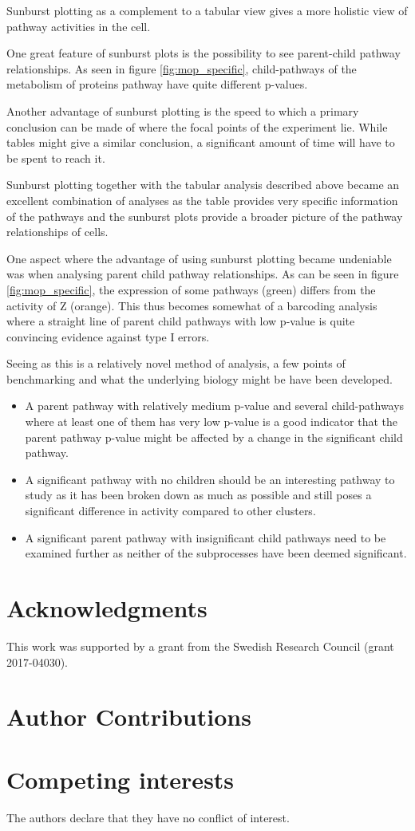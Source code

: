\documentclass[11pt]{article}
\begin{document}
  Sunburst plotting as a complement to a tabular view gives a more holistic view of pathway activities in the cell.

  One great feature of sunburst plots is the possibility to see parent-child pathway relationships. As seen in figure \ref{fig:mop_specific}, child-pathways of the metabolism of proteins pathway have quite different p-values.

  Another advantage of sunburst plotting is the speed to which a primary conclusion can be made of where the focal points of the experiment lie. While tables might give a similar conclusion, a significant amount of time will have to be spent to reach it.

  Sunburst plotting together with the tabular analysis described above became an excellent combination of analyses as the table provides very specific information of the pathways and the sunburst plots provide a broader picture of the pathway relationships of cells.

  One aspect where the advantage of using sunburst plotting became undeniable was when analysing parent child pathway relationships. As can be seen in figure \ref{fig:mop_specific}, the expression of some pathways (green) differs from the activity of Z (orange). This thus becomes somewhat of a barcoding analysis where a straight line of parent child pathways with low p-value is quite convincing evidence against type I errors.

  Seeing as this is a relatively novel method of analysis, a few points of benchmarking and what the underlying biology might be have been developed.

  \begin{itemize}
      \item A parent pathway with relatively medium p-value and several child-pathways where at least one of them has very low p-value is a good indicator that the parent pathway p-value might be affected by a change in the significant child pathway.
      \item A significant pathway with no children should be an interesting pathway to study as it has been broken down as much as possible and still poses a significant difference in activity compared to other clusters.
      \item A significant parent pathway with insignificant child pathways need to be examined further as neither of the subprocesses have been deemed significant.
    \end{itemize}

\section*{Acknowledgments}

This work was supported by a grant from the Swedish Research Council (grant
2017-04030).

\section*{Author Contributions}

\section*{Competing interests}

The authors declare that they have no conflict of interest.

\printbibliography[title=References]
\end{document}
